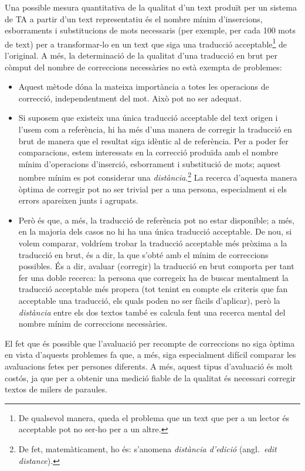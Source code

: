 \begin{enumerate}
\begin{enumerate}
Una possible mesura quantitativa de la qualitat d'un text produït per
un sistema de TA a partir d'un text representatiu és el nombre mínim
d'insercions, esborraments i substitucions de mots necessaris (per
exemple, per cada 100 mots de text) per a transformar-lo en un text
que siga una traducció acceptable\footnote{De qualsevol manera, queda
  el problema que un text que per a un lector és acceptable pot no
  ser-ho per a un altre.} de l'original. A més, la determinació de la
qualitat d'una traducció en brut per còmput del nombre de correccions
necessàries no està exempta de problemes:
\begin{itemize}
\item Aquest mètode dóna la mateixa importància a totes les operacions
  de correcció, independentment del mot. Això pot no ser adequat.
\item Si suposem que existeix una única traducció acceptable del text
  origen i l'usem com a referència, hi ha més d'una manera de corregir
  la traducció en brut de manera que el resultat siga idèntic al de
  referència. Per a poder fer comparacions, estem interessats en la
  correcció produïda amb el nombre mínim d'operacions d'inserció,
  esborrament i substitució de mots; aquest nombre mínim es pot
  considerar una \emph{distància}.\footnote{De fet, matemàticament, ho
    és: s'anomena \emph{distància d'edició} (angl.~\emph{edit
      distance}).} La recerca d'aquesta manera òptima de corregir pot
  no ser trivial per a una persona, especialment si els errors
  apareixen junts i agrupats. 
\item Però és que, a més, la traducció de referència pot no estar
  disponible; a més, en la majoria dels casos no hi ha una única
  traducció acceptable. De nou, si volem comparar, voldríem trobar la
  traducció acceptable més pròxima a la traducció en brut, és a dir,
  la que s'obté amb el mínim de correccions possibles. És a dir,
  avaluar (corregir) la traducció en brut comporta per tant fer una
  doble recerca: la persona que corregeix ha de buscar mentalment la
  traducció acceptable més propera (tot tenint en compte els criteris
  que fan acceptable una traducció, els quals poden no ser fàcils
  d'aplicar), però la \emph{distància} entre els dos textos també es
  calcula fent una recerca mental del nombre mínim de correccions
  necessàries.
\end{itemize}
  El fet que és
possible que l'avaluació per recompte de correccions no siga òptima en
vista d'aquests problemes fa que, a més, siga especialment difícil
comparar les avaluacions fetes per persones diferents. A més, aquest
tipus d'avaluació és molt costós, ja que per a obtenir una medició
fiable de la qualitat és necessari corregir textos de milers de
paraules.


\end{enumerate}
\end{enumerate}
